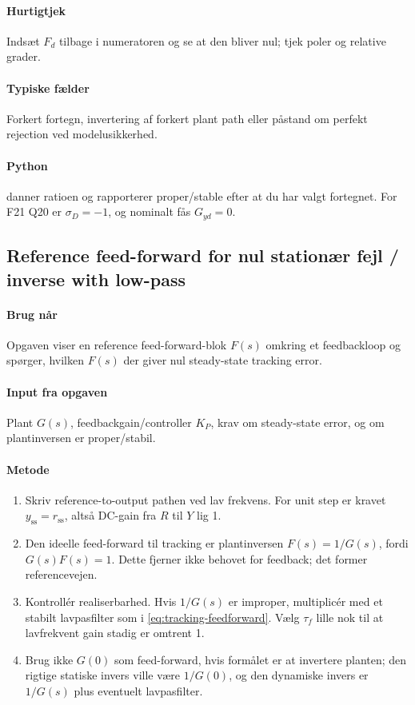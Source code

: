 \paragraph{Hurtigtjek}
Indsæt \(F_d\) tilbage i numeratoren og se at den bliver nul; tjek poler og relative grader.

\paragraph{Typiske fælder}
Forkert fortegn, invertering af forkert plant path eller påstand om perfekt rejection ved
modelusikkerhed.

\paragraph{Python}
 danner ratioen og
rapporterer proper/stable efter at du har valgt fortegnet. For F21 Q20 er
\(\sigma_D=-1\), og nominalt fås \(G_{yd}=0\).

\subsection{Reference feed-forward for nul stationær fejl / inverse with low-pass}
\label{sec:tracking-feedforward}

\paragraph{Brug når}
Opgaven viser en reference feed-forward-blok \(F(s)\) omkring et feedbackloop og spørger,
hvilken \(F(s)\) der giver nul steady-state tracking error.

\paragraph{Input fra opgaven}
Plant \(G(s)\), feedbackgain/controller \(K_P\), krav om steady-state error, og om
plantinversen er proper/stabil.

\paragraph{Metode}
\begin{enumerate}
\item Skriv reference-to-output pathen ved lav frekvens. For unit step er kravet
      \(y_{\mathrm{ss}}=r_{\mathrm{ss}}\), altså DC-gain fra \(R\) til \(Y\) lig 1.
\item Den ideelle feed-forward til tracking er plantinversen \(F(s)=1/G(s)\), fordi
      \(G(s)F(s)=1\). Dette fjerner ikke behovet for feedback; det former referencevejen.
\item Kontrollér realiserbarhed. Hvis \(1/G(s)\) er improper, multiplicér med et stabilt
      lavpasfilter som i \eqref{eq:tracking-feedforward}. Vælg \(\tau_f\) lille nok til
      at lavfrekvent gain stadig er omtrent 1.
\item Brug ikke \(G(0)\) som feed-forward, hvis formålet er at invertere planten; den
      rigtige statiske invers ville være \(1/G(0)\), og den dynamiske invers er
      \(1/G(s)\) plus eventuelt lavpasfilter.
\end{enumerate}

